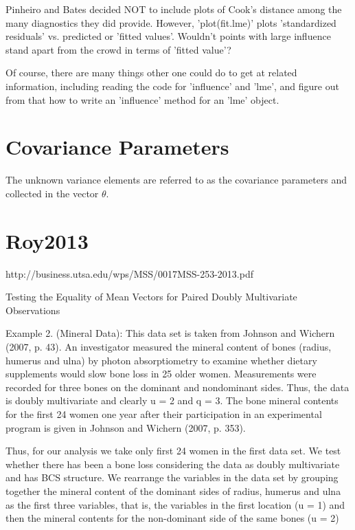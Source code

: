 \documentclass[12pt, a4paper]{report}
\theoremstyle{plain}
\theoremstyle{definition}
\theoremstyle{remark}
\begin{document}
Pinheiro and Bates decided NOT to include plots of Cook's distance among the many diagnostics they did provide.  
However, 'plot(fit.lme)' plots 'standardized residuals' vs. predicted or 'fitted values'.  
Wouldn't points with large influence stand apart from the crowd in terms of 'fitted value'?

Of course, there are many things other one could do to get at related information, including reading the code for 'influence' and 'lme', and 
figure out from that how to write an 'influence' method for an 'lme' object. 









\section{Covariance Parameters} %
The unknown variance elements are referred to as the covariance parameters and collected in the vector $\theta$.




\section{Roy2013}

http://business.utsa.edu/wps/MSS/0017MSS-253-2013.pdf


Testing the Equality of Mean Vectors for Paired Doubly Multivariate Observations 


Example 2. (Mineral Data): This data set is taken from Johnson and Wichern (2007, p. 43).
An investigator measured the mineral content of bones (radius, humerus and ulna) by photon
absorptiometry to examine whether dietary supplements would slow bone loss in 25 older women.
Measurements were recorded for three bones on the dominant and nondominant sides. Thus,
the data is doubly multivariate and clearly u = 2 and q = 3.
The bone mineral contents for the ﬁrst 24 women one year after their participation in an
experimental program is given in Johnson and Wichern (2007, p. 353). 



Thus, for our analysis
we take only ﬁrst 24 women in the ﬁrst data set. We test whether there has been a bone loss
considering the data as doubly multivariate and has BCS structure. We rearrange the variables
in the data set by grouping together the mineral content of the dominant sides of radius, humerus
and ulna as the ﬁrst three variables, that is, the variables in the ﬁrst location (u = 1) and then
the mineral contents for the non-dominant side of the same bones (u = 2)
\end{document}
